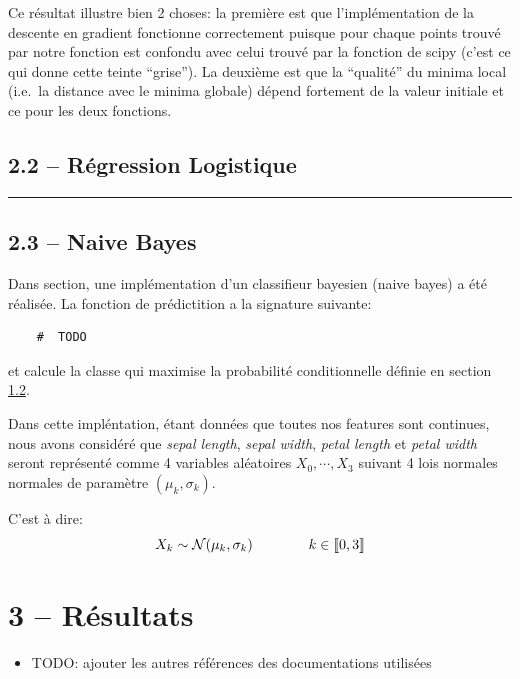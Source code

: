 \documentclass[
]{article}
\providecommand{\tightlist}{%
  \setlength{\itemsep}{0pt}\setlength{\parskip}{0pt}}
\begin{document}
Ce résultat illustre bien 2 choses: la première est que l'implémentation
de la descente en gradient fonctionne correctement puisque pour chaque
points trouvé par notre fonction est confondu avec celui trouvé par la
fonction de scipy (c'est ce qui donne cette teinte ``grise''). La
deuxième est que la ``qualité'' du minima local (i.e.~la distance avec
le minima globale) dépend fortement de la valeur initiale et ce pour les
deux fonctions.

\newpage{}

\hypertarget{ruxe9gression-logistique-1}{%
\subsection{2.2 -- Régression
Logistique}\label{ruxe9gression-logistique-1}}

\begin{center}\rule{0.5\linewidth}{0.5pt}\end{center}

\hypertarget{naive-bayes-1}{%
\subsection{2.3 -- Naive Bayes}\label{naive-bayes-1}}

Dans section, une implémentation d'un classifieur bayesien (naive bayes)
a été réalisée. La fonction de prédictition a la signature suivante:

\begin{lstlisting}
    #  TODO
\end{lstlisting}

et calcule la classe qui maximise la probabilité conditionnelle définie
en section \href{#naive-bayes}{1.2}.

Dans cette impléntation, étant données que toutes nos features sont
continues, nous avons considéré que \emph{sepal length}, \emph{sepal
width}, \emph{petal length} et \emph{petal width} seront représenté
comme 4 variables aléatoires \(X_0, \cdots, X_3\) suivant 4 lois
normales normales de paramètre \((\mu_k, \sigma_k)\).

C'est à dire: \[
X_k \sim \mathcal{N}( \mu_k, \sigma_k) \qquad \qquad k \in \llbracket{0, 3}\rrbracket
\]

\newpage{}

\hypertarget{ruxe9sultats}{%
\section{3 -- Résultats}\label{ruxe9sultats}}

\printbibliography[heading=bibintoc, title={Références}]

\begin{itemize}
\tightlist
\item
  TODO: ajouter les autres références des documentations utilisées
\end{itemize}
\end{document}
